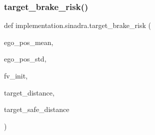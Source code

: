 \subsubsection{\texorpdfstring{target\+\_\+brake\+\_\+risk()}{target\_brake\_risk()}}
{\footnotesize\ttfamily def implementation.\+sinadra.\+target\+\_\+brake\+\_\+risk (\begin{DoxyParamCaption}\item[{}]{ego\+\_\+pos\+\_\+mean,  }\item[{}]{ego\+\_\+pos\+\_\+std,  }\item[{}]{fv\+\_\+init,  }\item[{}]{target\+\_\+distance,  }\item[{}]{target\+\_\+safe\+\_\+distance }\end{DoxyParamCaption})}

